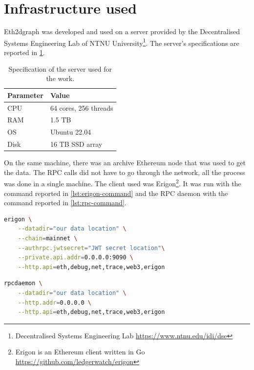 \label{chapter-5}

\section{Infrastructure used}

Eth2dgraph was developed and used on a server provided by the Decentralised Systems Engineering Lab of NTNU University\footnote{Decentralised
Systems Engineering Lab \url{https://www.ntnu.edu/idi/dse}}. The server's specifications are reported in \cref{table:server-specs}.

\begin{table}[ht!]
\centering
    \begin{threeparttable}
    \begin{tabular}  { m{3cm} m{6cm} } 
    \toprule
    \textbf{Parameter} & \textbf{Value}   \\
    \midrule
    CPU    &    64 cores, 256 threads \\[1.3ex]
    RAM    &    1.5 TB \\[1.3ex]
    OS    &     Ubuntu 22.04 \\[1.3ex]
    Disk    &   16 TB SSD array \\[1.3ex]
    \bottomrule
    \end{tabular}
    \end{threeparttable}
\caption[Specification of the server used for the work]{Specification of the server used for the work.}
\label{table:server-specs}
\end{table}

On the same machine, there was an archive Ethereum node that was used to get the data. The RPC calls did not have to go through the network, all the process was done in a single machine. The client used was Erigon\footnote{Erigon is an Ethereum client written in Go \url{https://github.com/ledgerwatch/erigon}}. It was run with the command reported in \cref{lst:erigon-command} and the RPC daemon with the command reported in \cref{lst:rpc-command}.

\begin{lstlisting}[language=bash,caption={Erigon command},label={lst:erigon-command},captionpos=b,numbers=none]
erigon \
    --datadir="our data location" \
    --chain=mainnet \
    --authrpc.jwtsecret="JWT secret location"\
    --private.api.addr=0.0.0.0:9090 \
    --http.api=eth,debug,net,trace,web3,erigon
\end{lstlisting}

\begin{lstlisting}[language=bash,caption={RPC daemon command},label={lst:rpc-command},captionpos=b,numbers=none]
rpcdaemon \
    --datadir="our data location" \
    --http.addr=0.0.0.0 \
    --http.api=eth,debug,net,trace,web3,erigon
\end{lstlisting}

